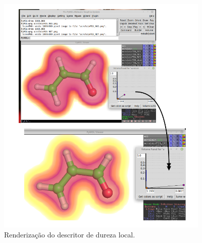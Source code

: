 \documentclass[a4paper,11pt]{refart}
\begin{document}
\hspace*{-\leftmarginwidth}
\begin{minipage}{\fullwidth}
\begin{figure}[H]
\begin{center}
\includegraphics[width=4in]{images/img10}
\caption{Renderização do descritor de dureza local.}
\label{fig_tut1_9}
\end{center}
\end{figure}
\end{minipage}
\end{document}
